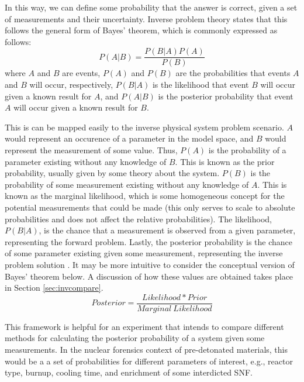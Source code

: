 In this way, we can define some probability that the answer is correct, given a
set of measurements and their uncertainty. Inverse problem theory states that
this follows the general form of Bayes' theorem, which is commonly expressed as
follows:
\begin{equation}
  \label{eq:bayes}
  P(A|B) = \frac{P(B|A)P(A)}{P(B)}
\end{equation}
where $A$ and $B$ are events, $P(A)$ and $P(B)$ are the probabilities that events
$A$ and $B$ will occur, respectively, $P(B|A)$ is the likelihood that event 
$B$ will occur given a known result for $A$, and $P(A|B)$ is the posterior 
probability that event $A$ will occur given a known result for $B$.

This is can be mapped easily to the inverse physical system problem scenario.
$A$ would represent an occurence of a parameter in the model space, and $B$
would represent the measurement of some value. Thus, $P(A)$ is the probability
of a parameter existing without any knowledge of $B$. This is known as the
prior probability, usually given by some theory about the system. $P(B)$ is the
probability of some measurement existing without any knowledge of $A$. This is
known as the marginal likelihood, which is some homogeneous concept for the
potential measurements that could be made (this only serves to scale to
absolute probabilities and does not affect the relative probabilities). The
likelihood, $P(B|A)$, is the chance that a measurement is observed from a given
parameter, representing the forward problem.  Lastly, the posterior probability
is the chance of some parameter existing given some measurement, representing
the inverse problem solution \cite{inverse_theory}.  It may be more intuitive
to consider the conceptual version of Bayes' theorem below.  A discussion of
how these values are obtained takes place in Section \ref{sec:invcompare}.
\begin{equation}
  \label{eq:bayes_words}
  Posterior = \frac{Likelihood * Prior}{Marginal \ Likelihood} 
\end{equation} 

This framework is helpful for an experiment that intends to compare different
methods for calculating the posterior probability of a system given some
measurements.  In the nuclear forensics context of pre-detonated materials,
this would be a a set of probabilities for different parameters of interest,
e.g., reactor type, burnup, cooling time, and enrichment of some interdicted
\gls{SNF}. 
